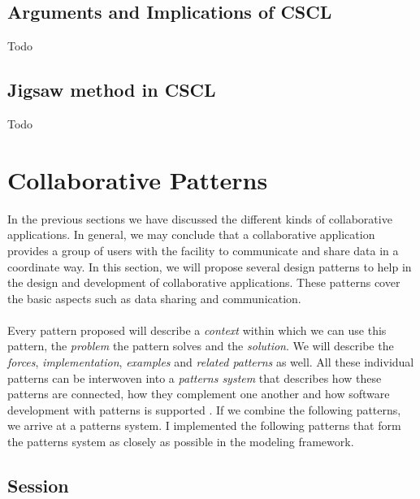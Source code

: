 \subsection{Arguments and Implications of CSCL}

Todo

\subsection{Jigsaw method in CSCL}

Todo

\section{Collaborative Patterns}

In the previous sections we have discussed the different kinds of collaborative applications. In general, we may conclude that a collaborative application provides a group of users with the facility to communicate and share data in a coordinate way. In this section, we will propose several design patterns to help in the design and development of collaborative applications. These patterns cover the basic aspects such as data sharing and communication.
\\ \\
Every pattern proposed will describe a \textit{context} within which we can use this pattern, the \textit{problem} the pattern solves and the \textit{solution}. We will describe the \textit{forces}, \textit{implementation}, \textit{examples} and \textit{related patterns} as well. All these individual patterns can be interwoven into a \textit{patterns system} that describes how these patterns are connected, how they complement one another and how software development with patterns is supported \cite{DesignPatternsColl}. If we combine the following patterns, we arrive at a patterns system. I implemented the following patterns that form the patterns system as closely as possible in the modeling framework.

\subsection{Session}

